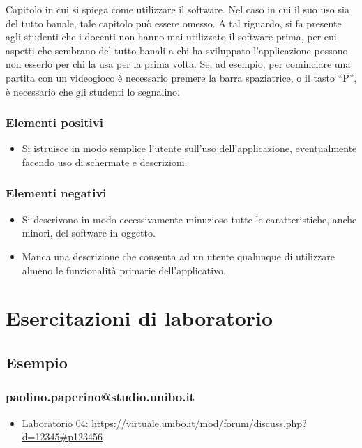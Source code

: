 \documentclass[a4paper,12pt]{report}
\begin{document}
Capitolo in cui si spiega come utilizzare il software. Nel caso in cui il suo uso sia del tutto
banale, tale capitolo può essere omesso.
%
A tal riguardo, si fa presente agli studenti che i docenti non hanno mai utilizzato il software
prima, per cui aspetti che sembrano del tutto banali a chi ha sviluppato l'applicazione possono non
esserlo per chi la usa per la prima volta.
%
Se, ad esempio, per cominciare una partita con un videogioco è necessario premere la barra
spaziatrice, o il tasto ``P'', è necessario che gli studenti lo segnalino.

\subsection*{Elementi positivi}

\begin{itemize}
 \item Si istruisce in modo semplice l'utente sull'uso dell'applicazione, eventualmente facendo uso di schermate e descrizioni.
\end{itemize}

\subsection*{Elementi negativi}
\begin{itemize}
 \item Si descrivono in modo eccessivamente minuzioso tutte le caratteristiche, anche minori, del software in oggetto.
 \item Manca una descrizione che consenta ad un utente qualunque di utilizzare almeno le funzionalità primarie dell'applicativo.
\end{itemize}

\chapter{Esercitazioni di laboratorio}

\section*{Esempio}

\subsection{paolino.paperino@studio.unibo.it}

\begin{itemize}
 \item Laboratorio 04: \url{https://virtuale.unibo.it/mod/forum/discuss.php?d=12345#p123456}
\end{itemize}



\end{document}
